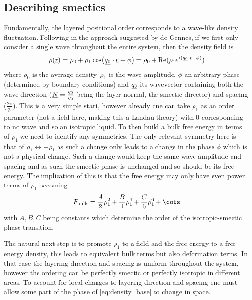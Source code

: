 \documentclass[12pt]{article}
\newcommand{\suf}[2]{\stackunder[0.5pt]{\stackunder[1pt]{\ensuremath{#1}}{\rule{\widthof{\ensuremath{#2}}*\real{0.9}}{.1ex}}}{}}
\newcommand{\su}[1]{\suf{#1}{#1}}
\newcommand{\ssu}[1]{\scriptsize\su{#1}\normalsize}
\begin{document}
    \subsection{Describing smectics\cite{oswaldSmecticColumnarLiquid2005}}\label{sec:degennes}
        Fundamentally, the layered positional order corresponds to a wave-like density fluctuation.
        Following \cite{oswaldSmecticColumnarLiquid2005} in the approach suggested by de Gennes, if we first only consider a single wave throughout the entire system, then the density field is
        \begin{equation}\label{eq:density_base}
            \rho(\su{r}) = \rho_0 + \rho_1\cos(\su{q_0}\cdot\su{r} + \phi) = \rho_0 + \Re(\rho_1 e^{i(\ssu{q_0} \cdot \ssu{r} + \phi)})
        \end{equation}
        where $\rho_0$ is the average density, $\rho_1$ is the wave amplitude, $\phi$ an arbitrary phase (determined by boundary conditions) and $\su{q_0}$ its wavevector containing both the wave direction ($\su{N} = \frac{\ssu{q_0}}{q_0}$ being the layer normal, the smectic director) and spacing ($\frac{2\pi}{q_0}$).
        This is a very simple start, however already one can take $\rho_1$ as an order parameter (not a field here, making this a Landau theory) with 0 corresponding to no wave and so an isotropic liquid.
        To then build a bulk free energy in terms of $\rho_1$ we need to identify any symmetries.
        The only relevant symmetry here is that of $\rho_1 \leftrightarrow -\rho_1$ as such a change only leads to a change in the phase $\phi$ which is not a physical change.
        Such a change would keep the same wave amplitude and spacing and as such the smectic phase is unchanged and so should be its free energy.
        The implication of this is that the free energy may only have even power terms of $\rho_1$ becoming
        \begin{equation}
            F_\text{bulk} = \frac{A}{2}\rho_1^2 + \frac{B}{4}\rho_1^4 + \frac{C}{6}\rho_1^6 + \cots
        \end{equation}
        with $A, B, C$ being constants which determine the order of the isotropic-smectic phase transition\cite{oswaldSmecticColumnarLiquid2005}.

        The natural next step is to promote $\rho_1$ to a field and the free energy to a free energy density, this leads to equivalent bulk terms but also deformation terms.
        In that case the layering direction and spacing is uniform throughout the system, however the ordering can be perfectly smectic or perfectly isotropic in different areas.
        To account for local changes to layering direction and spacing one must allow some part of the phase of \cref{eq:density_base} to change in space.
\end{document}
